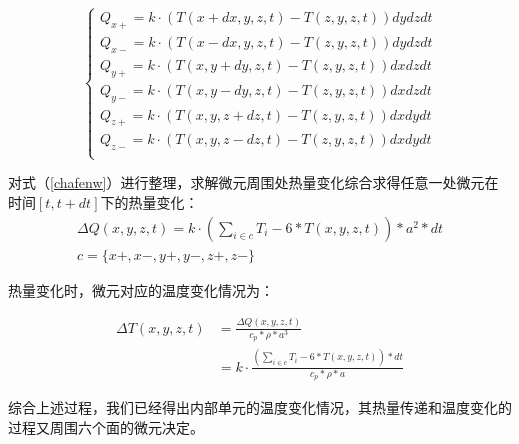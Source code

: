 \documentclass{my_paper}
\begin{document}
\begin{equation}
        \begin{cases}
            Q_{x+} = k \cdot (T(x+dx,y,z,t)-T(z,y,z,t))dydzdt\\
            Q_{x-} = k \cdot (T(x-dx,y,z,t)-T(z,y,z,t))dydzdt\\
            Q_{y+} = k \cdot (T(x,y+dy,z,t)-T(z,y,z,t))dxdzdt\\
            Q_{y-} = k \cdot (T(x,y-dy,z,t)-T(z,y,z,t))dxdzdt\\
            Q_{z+} = k \cdot (T(x,y,z+dz,t)-T(z,y,z,t))dxdydt\\
            Q_{z-} = k \cdot (T(x,y,z-dz,t)-T(z,y,z,t))dxdydt\\
        \end{cases}
        \label{chafenw}
\end{equation}

对式（\ref{chafenw}）进行整理，求解微元周围处热量变化综合求得任意一处微元在时间$[t,t+dt]$下的热量变化：
\begin{equation}
    \begin{aligned}
        \Delta Q(x,y,z,t) = k \cdot (\sum_{i\in c}T_i-6*T(x,y,z,t))*a^2*dt\\
        c = \{x+,x-,y+,y-,z+,z-\}
    \end{aligned}
\label{shi1}
\end{equation}

热量变化时，微元对应的温度变化情况为：

\begin{equation}
    \begin{aligned}
        \Delta T(x,y,z,t) &= \frac{\Delta Q(x,y,z,t)}{c_p * \rho * a^3}\\
        & = k \cdot \frac{(\sum_{i\in c}T_i-6*T(x,y,z,t))*dt}{c_p * \rho * a}
    \end{aligned}
    \label{wdjs}
\end{equation}

综合上述过程，我们已经得出内部单元的温度变化情况，其热量传递和温度变化的过程又周围六个面的微元决定。
\end{document}
